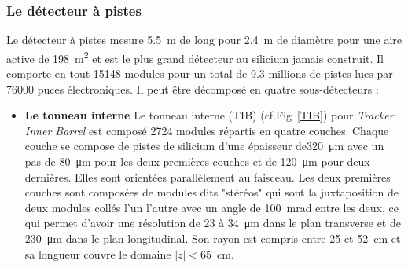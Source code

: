 \subsubsection{Le détecteur à pistes}
Le détecteur à pistes mesure \SI{5.5}{\meter} de long pour \SI{2.4}{\meter} de diamètre pour une aire active de \SI{198}{\square\meter} et est le plus grand détecteur au silicium jamais construit. Il comporte en tout \num{15148} modules pour un total de \num{9.3} millions de pistes lues par \num{76000} puces électroniques. Il peut être décomposé en quatre sous-détecteurs :

\begin{itemize}[label=$\bullet$]
\item \textbf{Le tonneau interne} Le tonneau interne (TIB) (cf.Fig~\ref{TIB}) pour  \textit{Tracker Inner Barrel} est composé \num{2724} modules répartis en quatre couches. Chaque couche se compose de pistes de silicium d'une épaisseur de\SI{320}{\micro\meter} avec un pas de \SI{80}{\micro\meter} pour les deux premières couches et de \SI{120}{\micro\meter} pour deux dernières. Elles sont orientées parallèlement au faisceau. Les deux premières couches sont composées de modules dits "stéréos" qui sont la juxtaposition de deux modules collés l'un l'autre avec un angle de \SI{100}{\milli\radian} entre les deux, ce qui permet d'avoir une résolution de \num{23} à \SI{34}{\micro\m} dans le plan transverse et de \SI{230}{\micro\meter} dans le plan longitudinal. Son rayon est compris entre \num{25} et \SI{52}{\centi\meter} et sa longueur couvre le domaine $|z|<$\SI{65}{\centi\meter}.


\end{itemize}
